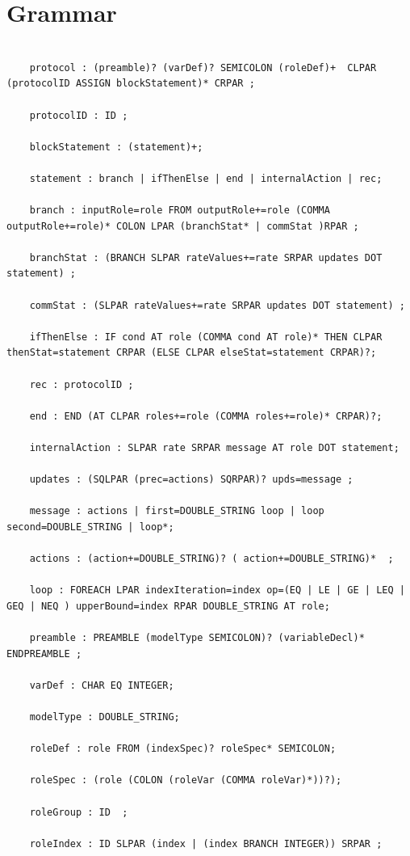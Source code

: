 \section{Grammar}
\label{sec:grammar}
	\begin{verbatim}
	
	protocol : (preamble)? (varDef)? SEMICOLON (roleDef)+  CLPAR (protocolID ASSIGN blockStatement)* CRPAR ;
	
	protocolID : ID ;
	
	blockStatement : (statement)+;
	
	statement : branch | ifThenElse | end | internalAction | rec;
	
	branch : inputRole=role FROM outputRole+=role (COMMA outputRole+=role)* COLON LPAR (branchStat* | commStat )RPAR ;
	
	branchStat : (BRANCH SLPAR rateValues+=rate SRPAR updates DOT statement) ;
	
	commStat : (SLPAR rateValues+=rate SRPAR updates DOT statement) ;
	
	ifThenElse : IF cond AT role (COMMA cond AT role)* THEN CLPAR thenStat=statement CRPAR (ELSE CLPAR elseStat=statement CRPAR)?;
	
	rec : protocolID ;
	
	end : END (AT CLPAR roles+=role (COMMA roles+=role)* CRPAR)?;
	
	internalAction : SLPAR rate SRPAR message AT role DOT statement;
	
	updates : (SQLPAR (prec=actions) SQRPAR)? upds=message ;
	
	message : actions | first=DOUBLE_STRING loop | loop second=DOUBLE_STRING | loop*;
	
	actions : (action+=DOUBLE_STRING)? ( action+=DOUBLE_STRING)*  ;
	
	loop : FOREACH LPAR indexIteration=index op=(EQ | LE | GE | LEQ | GEQ | NEQ ) upperBound=index RPAR DOUBLE_STRING AT role;
	
	preamble : PREAMBLE (modelType SEMICOLON)? (variableDecl)* ENDPREAMBLE ;
	
	varDef : CHAR EQ INTEGER;
	
	modelType : DOUBLE_STRING;
	
	roleDef : role FROM (indexSpec)? roleSpec* SEMICOLON;
	
	roleSpec : (role (COLON (roleVar (COMMA roleVar)*))?);
	
	roleGroup : ID  ;
	
	roleIndex : ID SLPAR (index | (index BRANCH INTEGER)) SRPAR ;
	

\end{verbatim}
